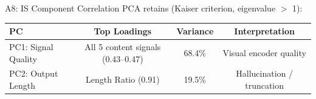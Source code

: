 \begin{frame}[shrink=10]{A8: IS Component Correlation}
  \vspace{2pt}
  {\small PCA retains  (Kaiser criterion, eigenvalue $>$ 1):}

  \vspace{6pt}

  \centering
  \begin{tabular}{@{}lccc@{}}
    \toprule
    \textbf{PC} & \textbf{Top Loadings} & \textbf{Variance} & \textbf{Interpretation} \\
    \midrule
    \cellcolor{ArgosTeal!10} PC1: Signal Quality & All 5 content signals (0.43--0.47) & 68.4\% & Visual encoder quality \\
    \cellcolor{ArgosGray!10} PC2: Output Length & Length Ratio (0.91) & 19.5\% & Hallucination / truncation \\
    \bottomrule
  \end{tabular}

  \vspace{6pt}


\end{frame}
